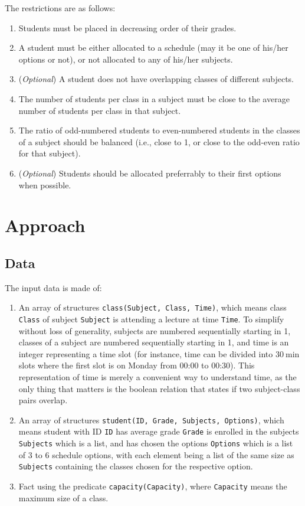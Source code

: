 \documentclass[runningheads]{llncs}
\begin{document}
The restrictions are as follows:
\begin{enumerate}
    \item Students must be placed in decreasing order of their grades.
    \item A student must be either allocated to a schedule (may it be one of his/her options or not), or not allocated to any of his/her subjects.
    \item (\textit{Optional}) A student does not have overlapping classes of different subjects.
    \item The number of students per class in a subject must be close to the average number of students per class in that subject.
    \item The ratio of odd-numbered students to even-numbered students in the classes of a subject should be balanced (i.e., close to 1, or close to the odd-even ratio for that subject).
    \item (\textit{Optional}) Students should be allocated preferrably to their first options when possible.
\end{enumerate}

\section{Approach}

\subsection{Data}

The input data is made of:
\begin{enumerate}
    \item An array of structures \texttt{class(Subject, Class, Time)}, which means class \texttt{Class} of subject \texttt{Subject} is attending a lecture at time \texttt{Time}. To simplify without loss of generality, subjects are numbered sequentially starting in 1, classes of a subject are numbered sequentially starting in 1, and time is an integer representing a time slot (for instance, time can be divided into $\SI{30}{\minute}$ slots where the first slot is on Monday from 00:00 to 00:30). This representation of time is merely a convenient way to understand time, as the only thing that matters is the boolean relation that states if two subject-class pairs overlap.
    \item An array of structures \texttt{student(ID, Grade, Subjects, Options)}, which means student with ID \texttt{ID} has average grade \texttt{Grade} is enrolled in the subjects \texttt{Subjects} which is a list, and has chosen the options  \texttt{Options} which is a list of 3 to 6 schedule options, with each element being a list of the same size as \texttt{Subjects} containing the classes chosen for the respective option.
    \item Fact using the predicate \texttt{capacity(Capacity)}, where \texttt{Capacity} means the maximum size of a class.
\end{enumerate}
\end{document}
